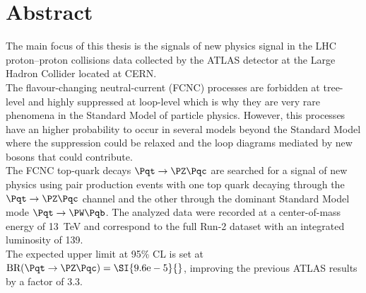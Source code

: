 \chapter*{Abstract}        %

\vspace{-1cm}
\begin{adjustwidth}{1.5cm}{1.5cm}
	The main focus of this thesis is the signals of new physics signal in the
	LHC proton–proton collisions data collected by the ATLAS detector at 
	the Large Hadron Collider located at CERN.\\		
	The flavour-changing neutral-current (FCNC) processes are forbidden at tree-level and 
	highly suppressed at loop-level which is why they are very rare phenomena in the Standard Model of particle physics.
	However, this processes have an higher probability to occur in several models beyond the Standard Model where the 
	suppression could be relaxed and the loop diagrams mediated by new bosons that could contribute.\\	
	The FCNC top-quark decays $\Pqt\rightarrow\PZ\Pqc$ are searched for a signal of new physics using 
	\ttbar pair production events with one top quark decaying through the $\Pqt\rightarrow\PZ\Pqc$ channel 
	and the other through the dominant Standard Model mode $\Pqt\rightarrow\PW\Pqb$.
	The analyzed data were recorded at a center-of-mass energy of \SI{13}{\TeV} and correspond to the full Run-2 dataset 
	with an integrated luminosity of \SI{139}{\ifb}.\\
	The expected upper limit at 95\% CL is set at $\mathrm{BR (\Pqt\rightarrow\PZ\Pqc)=\SI{9.6e-5}{}}$, 
	improving the previous ATLAS results by a factor of 3.3.
	
	
\end{adjustwidth}



